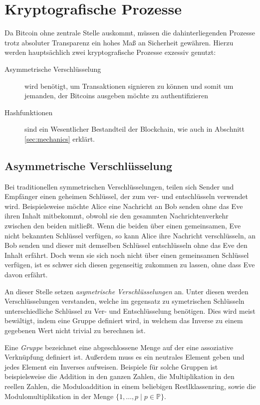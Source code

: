 \section{Kryptografische Prozesse}

Da Bitcoin ohne zentrale Stelle auskommt, müssen die dahinterliegenden Prozesse trotz absoluter Transparenz ein hohes Maß an Sicherheit gewähren.
Hierzu werden hauptsächlich zwei kryptografische Prozesse exzessiv genutzt:
\begin{description}
    \item[Asymmetrische Verschlüsselung] wird benötigt, um Transaktionen signieren zu können und somit um jemanden, der Bitcoins ausgeben möchte zu authentifizieren
    \item[Hashfunktionen] sind ein Wesentlicher Bestandteil der Blockchain, wie auch in Abschnitt \ref{sec:mechanics} erklärt.
\end{description}

\subsection{Asymmetrische Verschlüsselung}

Bei traditionellen symmetrischen Verschlüsselungen, teilen sich Sender und Empfänger einen geheimen Schlüssel, der zum ver- und entschlüsseln verwendet wird.
Beispielsweise möchte Alice eine Nachricht an Bob senden ohne das Eve ihren Inhalt mitbekommt, obwohl sie den gesammten Nachrichtenverkehr zwischen den beiden mitließt.
Wenn die beiden über einen gemeinsamen, Eve nicht bekannten Schlüssel verfügen, so kann Alice ihre Nachricht verschlüsseln, an Bob senden und dieser mit demselben Schlüssel entschlüsseln ohne das Eve den Inhalt erfährt.
Doch wenn sie sich noch nicht über einen gemeinsamen Schlüssel verfügen, ist es schwer sich diesen gegenseitig zukommen zu lassen, ohne dass Eve davon erfährt.

An dieser Stelle setzen \emph{asymetrische Verschlüsselungen} an.
Unter diesen werden Verschlüsselungen verstanden, welche im gegensatz zu symetrischen Schlüsseln unterschiedliche Schlüssel zu Ver- und Entschlüsselung benötigen.
Dies wird meist bewältigt, indem eine Gruppe definiert wird, in welchem das Inverse zu einem gegebenen Wert nicht trivial zu berechnen ist.

Eine \emph{Gruppe} bezeichnet eine abgeschlossene Menge auf der eine assoziative Verknüpfung definiert ist.
Außerdem muss es ein neutrales Element geben und jedes Element ein Inverses aufweisen.
Beispiele für solche Gruppen ist beispielsweise die Addition in den ganzen Zahlen, die Multiplikation in den reellen Zahlen, die Moduloaddition in einem beliebigen Restlklassenring, sowie die Modulomultiplikation in der Menge $\{ 1, \dotsc, p \mid p \in \mathbb{P}\}$.

